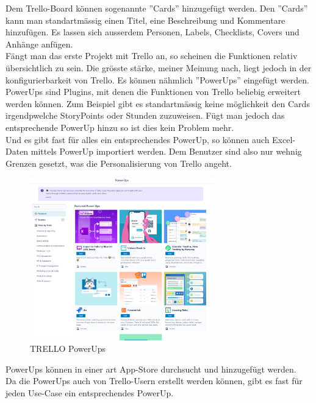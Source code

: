 Dem Trello-Board können sogenannte ''Cards'' hinzugefügt werden. Den ''Cards'' kann man standartmässig
einen Titel, eine Beschreibung und Kommentare hinzufügen. Es lassen sich ausserdem
Personen, Labels, Checklists, Covers und Anhänge anfügen.\\
Fängt man das erste Projekt mit Trello an, so scheinen die Funktionen relativ übersichtlich zu sein.
Die grösste stärke, meiner Meinung nach, liegt jedoch in der konfigurierbarkeit von Trello. Es können nähmlich
''PowerUps'' eingefügt werden. PowerUps sind Plugins, mit denen die Funktionen von Trello beliebig erweitert werden können.
Zum Beispiel gibt es standartmässig keine möglichkeit den Cards irgendpwelche StoryPoints oder Stunden zuzuweisen.
Fügt man jedoch das entsprechende PowerUp hinzu so ist dies kein Problem mehr.\\
Und es gibt fast für alles ein entsprechendes PowerUp, so können auch Excel-Daten mittels PowerUp importiert werden.
Dem Benutzer sind also nur wehnig Grenzen gesetzt, was die Personalisierung von Trello angeht.\\

\begin{figure}[H]
    \begin{center}
        \includegraphics[width=8cm]{../content/images/Trello/PowerUps.png}
        \caption{TRELLO PowerUps}
    \end{center}
\end{figure}

PowerUps können in einer art App-Store durchsucht und hinzugefügt werden.\\
Da die PowerUps auch von Trello-Usern erstellt werden können, gibt es fast für jeden Use-Case ein entsprechendes PowerUp.
 
